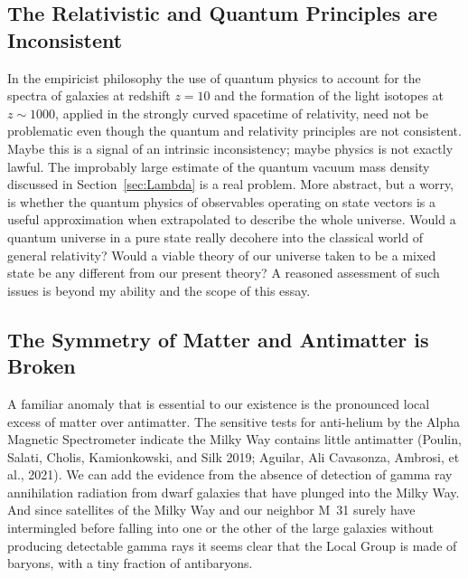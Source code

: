 \documentclass[fleqn,12pt]{article}
\begin{document}
\subsection{The Relativistic and Quantum Principles are Inconsistent}\label{sec:QM&GR}

In the empiricist philosophy the use of quantum physics to account for the spectra of galaxies at redshift $z=10$ and the formation of the light isotopes at $z\sim1000$, applied in the strongly curved spacetime of relativity, need not be problematic even though the quantum and relativity principles are not consistent.  Maybe this is a signal of an intrinsic inconsistency; maybe physics is not exactly lawful. The improbably large estimate of the quantum vacuum mass density discussed in Section~\ref{sec:Lambda} is a real problem. More abstract, but a worry, is whether the quantum physics of observables operating on state vectors is a useful approximation when extrapolated to describe the whole universe. Would a quantum universe in a pure state really decohere into the classical world of general relativity? Would a viable theory of our universe taken to be a mixed state be any different from our present theory? A reasoned assessment of such issues is beyond my ability and the scope of this essay. 


\subsection{The Symmetry of Matter and Antimatter is Broken}\label{sec:baryonnumber}

A familiar anomaly that is essential to our existence is the pronounced local excess of matter over antimatter. The sensitive tests for anti-helium by the Alpha Magnetic Spectrometer indicate the Milky Way contains little antimatter (Poulin, Salati, Cholis, Kamionkowski, and Silk 2019; Aguilar, Ali Cavasonza, Ambrosi, et al., 2021). We can add the evidence from the absence of detection of gamma ray annihilation radiation from dwarf  galaxies that have plunged into the Milky Way. And since satellites of the Milky Way and our neighbor M~31 surely have intermingled before falling into one or the other of the large galaxies without producing detectable gamma rays it seems clear that the Local Group is made of baryons, with a tiny fraction of antibaryons. 
\end{document}

